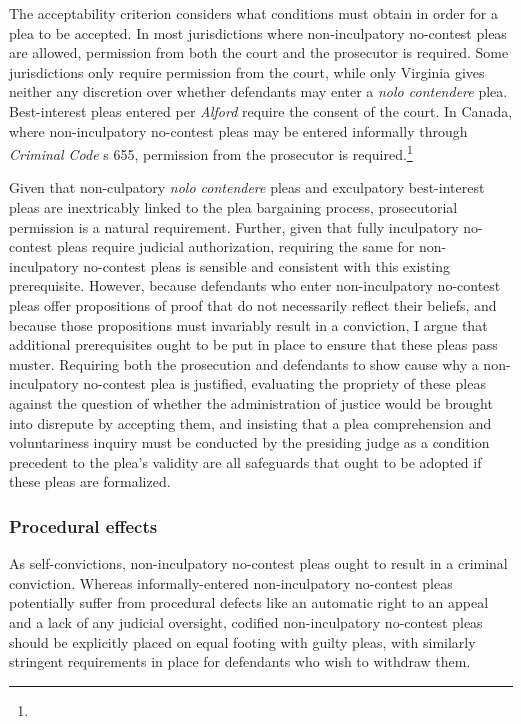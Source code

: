 The acceptability criterion considers what conditions must obtain in order for a plea to be accepted. In most jurisdictions where non-inculpatory no-contest pleas are allowed, permission from both the court and the prosecutor is required. Some jurisdictions only require permission from the court, while only Virginia gives neither any discretion over whether defendants may enter a \textit{nolo contendere} plea. Best-interest pleas entered per \textit{Alford} require the consent of the court. In Canada, where non-inculpatory no-contest pleas may be entered informally through \textit{Criminal Code} s 655, permission from the prosecutor is required.\footnote{} 

Given that non-culpatory \textit{nolo contendere} pleas and exculpatory best-interest pleas are inextricably linked to the plea bargaining process, prosecutorial permission is a natural requirement. Further, given that fully inculpatory no-contest pleas require judicial authorization, requiring the same for non-inculpatory no-contest pleas is sensible and consistent with this existing prerequisite. However, because defendants who enter non-inculpatory no-contest pleas offer propositions of proof that do not necessarily reflect their beliefs, and because those propositions must invariably result in a conviction, I argue that additional prerequisites ought to be put in place to ensure that these pleas pass muster. Requiring both the prosecution and defendants to show cause why a non-inculpatory no-contest plea is justified, evaluating the propriety of these pleas against the question of whether the administration of justice would be brought into disrepute by accepting them, and insisting that a plea comprehension and voluntariness inquiry must be conducted by the presiding judge as a condition precedent to the plea's validity are all safeguards that ought to be adopted if these pleas are formalized.

\subsubsection{Procedural effects}

As self-convictions, non-inculpatory no-contest pleas ought to result in a criminal conviction. Whereas informally-entered non-inculpatory no-contest pleas potentially suffer from procedural defects like an automatic right to an appeal and a lack of any judicial oversight, codified non-inculpatory no-contest pleas should be explicitly placed on equal footing with guilty pleas, with similarly stringent requirements in place for defendants who wish to withdraw them.

